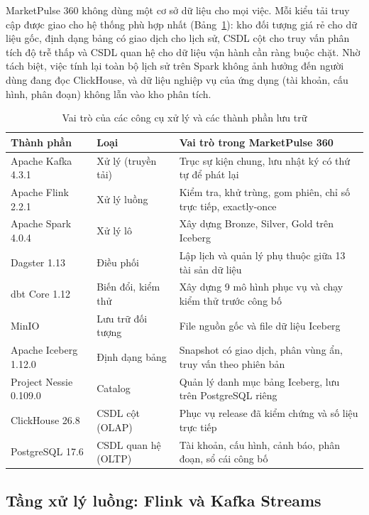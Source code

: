 MarketPulse 360 không dùng một cơ sở dữ liệu cho mọi việc. Mỗi kiểu tải truy cập được giao cho hệ thống phù hợp nhất (Bảng~\ref{tab:components}): kho đối tượng giá rẻ cho dữ liệu gốc, định dạng bảng có giao dịch cho lịch sử, CSDL cột cho truy vấn phân tích độ trễ thấp và CSDL quan hệ cho dữ liệu vận hành cần ràng buộc chặt. Nhờ tách biệt, việc tính lại toàn bộ lịch sử trên Spark không ảnh hưởng đến người dùng đang đọc ClickHouse, và dữ liệu nghiệp vụ của ứng dụng (tài khoản, cấu hình, phân đoạn) không lẫn vào kho phân tích.

\begin{table}[H]
\centering
\caption{Vai trò của các công cụ xử lý và các thành phần lưu trữ}
\label{tab:components}
\small
\renewcommand{\arraystretch}{1.2}
\begin{tabularx}{\textwidth}{>{\raggedright\arraybackslash}p{3.2cm} >{\raggedright\arraybackslash}p{2.3cm} >{\raggedright\arraybackslash}X}
\toprule
\textbf{Thành phần} & \textbf{Loại} & \textbf{Vai trò trong MarketPulse 360} \\
\midrule
Apache Kafka 4.3.1 & Xử lý (truyền tải) & Trục sự kiện chung, lưu nhật ký có thứ tự để phát lại \\
Apache Flink 2.2.1 & Xử lý luồng & Kiểm tra, khử trùng, gom phiên, chỉ số trực tiếp, exactly-once \\
Apache Spark 4.0.4 & Xử lý lô & Xây dựng Bronze, Silver, Gold trên Iceberg \\
Dagster 1.13 & Điều phối & Lập lịch và quản lý phụ thuộc giữa 13 tài sản dữ liệu \\
dbt Core 1.12 & Biến đổi, kiểm thử & Xây dựng 9 mô hình phục vụ và chạy kiểm thử trước công bố \\
\midrule
MinIO & Lưu trữ đối tượng & File nguồn gốc và file dữ liệu Iceberg \\
Apache Iceberg 1.12.0 & Định dạng bảng & Snapshot có giao dịch, phân vùng ẩn, truy vấn theo phiên bản \\
Project Nessie 0.109.0 & Catalog & Quản lý danh mục bảng Iceberg, lưu trên PostgreSQL riêng \\
ClickHouse 26.8 & CSDL cột (OLAP) & Phục vụ release đã kiểm chứng và số liệu trực tiếp \\
PostgreSQL 17.6 & CSDL quan hệ (OLTP) & Tài khoản, cấu hình, cảnh báo, phân đoạn, sổ cái công bố \\
\bottomrule
\end{tabularx}
\end{table}

\subsection{Tầng xử lý luồng: Flink và Kafka Streams}
\label{sec:c2-alt-streaming}

